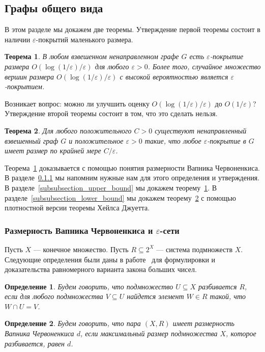 \documentclass[12pt]{article}
\newcommand{\eps}{\varepsilon}
\DeclareRobustCommand*{\CC}{\,\textendash\,\hskip 0pt}
\newtheorem{definition}{Определение}
\newtheorem{theorem}{Теорема}
\begin{document}
    \subsection{Графы общего вида}
    \label{subsection_general_graphs}
    В этом разделе мы докажем две теоремы.
    Утверждение первой теоремы состоит в наличии $\eps$-покрытий маленького размера.
    \begin{theorem}
        \label{upper_bound}
        В любом взвешенном ненаправленном графе $G$ есть $\eps$-покрытие размера $O(\log(1 / \eps) / \eps)$ для
        любого $\eps > 0$. Более того, случайное множество вершин размера $O(\log(1 / \eps) / \eps)$ с высокой вероятностью
        является $\eps$-покрытием.
    \end{theorem}
    Возникает вопрос: можно ли улучшить оценку $O(\log(1 / \eps) / \eps)$ до $O(1 / \eps)$? Утверждение второй теоремы
    состоит в том, что это сделать нельзя.
    \begin{theorem}
        \label{lower_bound}
        Для любого положительного $C > 0$ существуют ненаправленный взвешенный граф $G$ и положительное $\eps > 0$
        такие, что любое $\eps$-покрытие в $G$ имеет размер по крайней мере $C / \eps$.
    \end{theorem}
    Теорема~\ref{upper_bound} доказывается с помощью понятия размерности Вапника\CC Червоненкиса. В
    разделе~\ref{subsubsection_vapnik_chervonenkis} мы напомним нужные нам для этого определения и утверждения.
    В разделе~\ref{subsubsection_upper_bound} мы докажем теорему~\ref{upper_bound}.
    В разделе~\ref{subsubsection_lower_bound} мы докажем теорему~\ref{lower_bound} с помощью
    плотностной версии теоремы Хейлса\CC Джуетта.
    \subsubsection{Размерность Вапника\CC Червоненкиса и $\eps$-сети}
    \label{subsubsection_vapnik_chervonenkis}

    Пусть $X$ --- конечное множество. Пусть $R \subseteq 2^X$ --- система подмножеств $X$.
    Следующие определения были даны в работе~\cite{VC71} для формулировки и доказательства равномерного варианта
    закона больших чисел.

    \begin{definition}
        Будем говорить, что подмножество $U \subseteq X$ \emph{разбивается} $R$, если
        для любого подмножества $V \subseteq U$ найдется элемент $W \in R$ такой,
        что $W \cap U = V$.
    \end{definition}
    \begin{definition}
        Будем говорить, что пара $(X, R)$ имеет размерность Вапника\CC Червоненкиса $d$, если максимальный размер 
        подмножества $X$, которое разбивается, равен $d$.
    \end{definition}
\end{document}

